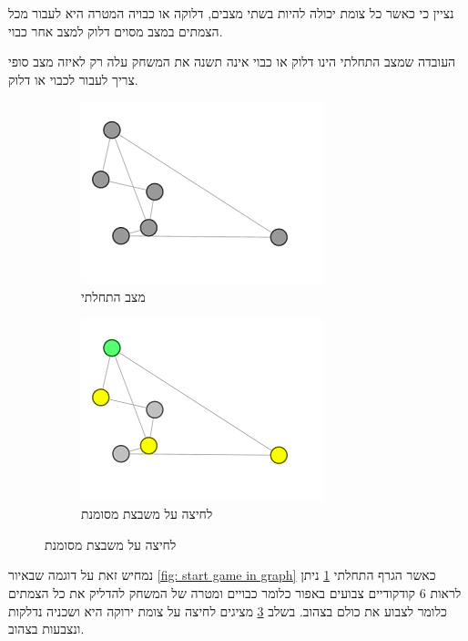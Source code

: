 \documentclass[12pt,leqno]{article}
\begin{document}
נציין כי כאשר כל צומת יכולה להיות בשתי מצבים,
דלוקה או כבויה המטרה היא לעבור מכל הצמתים במצב מסוים דלוק למצב אחר כבוי.

העובדה שמצב התחלתי הינו דלוק או כבוי אינה תשנה את המשחק עלה רק לאיזה מצב סופי צריך לעבור
לכבוי או דלוק.

\begin{figure}[ht]
    \caption{משחק על גרף לדוגמה}
    \label{fig: start game in graph}
    \begin{subfigure}{.5\textwidth}
        \centering
        \caption{מצב התחלתי}
        \label{subfig: graph game start}
        \includegraphics[scale=0.7]{images/graph_start_board.png}
    \end{subfigure}%
    \begin{subfigure}{.5\textwidth}
        \centering
        \caption{לחיצה על משבצת מסומנת}
        \label{subfig: graph game move}
        \includegraphics[scale=0.7]{images/graph_press.png}
    \end{subfigure}%
\end{figure}

נמחיש זאת על דוגמה שבאיור
\ref{fig: start game in graph}
כאשר הגרף התחלתי
\ref{subfig: graph game start}
ניתן לראות
$6$
קודקודיים
צבועים באפור כלומר כבויים ומטרה של המשחק להדליק את כל הצמתים כלומר לצבוע את כולם בצהוב.
בשלב 
\ref{subfig: graph game move}
מציגים  לחיצה על צומת ירוקה היא ושכניה נדלקות  ונצבעות בצהוב.
\end{document}
